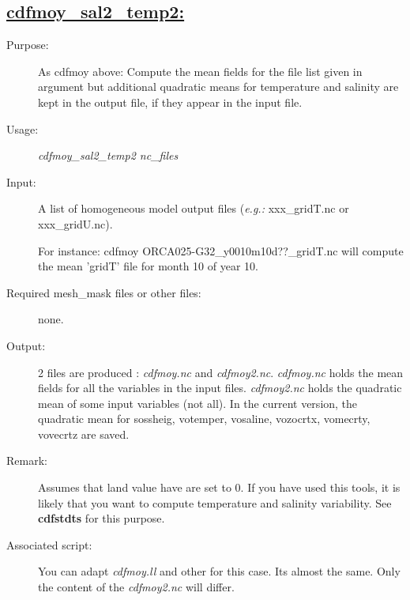 \documentclass[a4paper,11pt]{article}
\begin{document}
\subsection*{\underline{cdfmoy\_sal2\_temp2:}}
\begin{description}
\item[Purpose:] As cdfmoy above: Compute the mean fields for the file list given in argument but additional quadratic means for temperature
   and salinity are kept in the output file, if they appear in the input file.
\item[Usage:] {\em cdfmoy\_sal2\_temp2 nc\_files }
\item[Input:] A list of homogeneous model output files ({\em e.g.: } xxx\_gridT.nc or xxx\_gridU.nc). \

For instance: cdfmoy ORCA025-G32\_y0010m10d??\_gridT.nc will compute the mean 'gridT' file for month 10 of year 10.
\item[Required mesh\_mask files or other files:]  none.
\item[Output:] 2 files are produced : {\em cdfmoy.nc} and {\em cdfmoy2.nc}. {\em cdfmoy.nc} holds the mean fields
for all the variables in the input files. {\em cdfmoy2.nc} holds the quadratic mean of some input variables (not all). 
In the current version, the quadratic mean for sossheig, votemper, vosaline, vozocrtx, vomecrty, vovecrtz are saved.
\item[Remark:] Assumes that land value have are set to 0. If you have used this tools, it is likely that you want to compute temperature and
salinity variability. See {\bf cdfstdts}  for this purpose.
\item[Associated script:] You can adapt {\em cdfmoy.ll} and other for this case. Its almost the same. Only the content of the {\em cdfmoy2.nc} will differ. 
\end{description}
\end{document}
